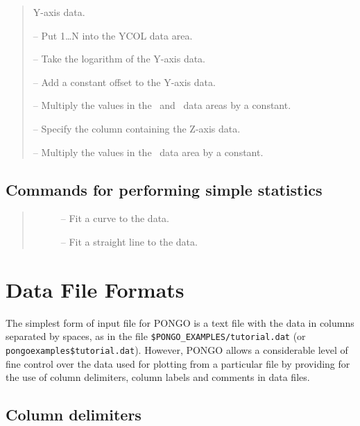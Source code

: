 \begin {quote}
\begin {description}
    Y-axis data.
  \item [\iiref{YLIN(EAR)}{YLINEAR}] -- Put 1\ldots N into the YCOL data
    area.
  \item [\iiref{YLOG(ARITHM)}{YLOGARITHM}] -- Take the logarithm of the
    Y-axis data.
  \item [\iiref{YOFF(SET)}{YOFFSET}] -- Add a constant offset to the
    Y-axis data.
  \item [\iref{YSCALE}] -- Multiply the values in the \ycol\ and \eycol\ data areas
    by a constant.
  \item [\iiref{ZC(OLUMN)}{ZCOLUMN}] -- Specify the column containing the
    Z-axis data.
  \item [\iref{ZSCALE}] -- Multiply the values in the \zcol\ data area by a
    constant.
  \end {description}
\end {quote}
\normalsize


\subsection{Commands for performing simple statistics}

\small
\begin {quote}
  \begin {description}
  \item [] -- Fit a curve to the data.
  \item [] -- Fit a straight line to the data.
  \end {description}
\end {quote}
\normalsize


\section{Data File Formats} \label{data_sect}

The simplest form of input file for PONGO is a text file with the data
in columns separated by spaces, as in the file
\verb+$PONGO_EXAMPLES/tutorial.dat+ (or \verb+pongoexamples$tutorial.dat+).
However, PONGO allows a considerable level of fine control over the
data used for plotting from a particular file by providing for the use
of column delimiters, column labels and comments in data files.

\subsection{Column delimiters}

